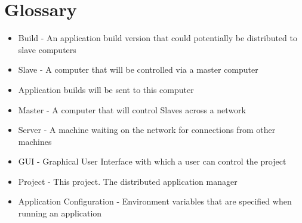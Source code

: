 \documentclass[a4paper,12pt,final]{article}
\begin{document}


\section{Glossary}
\begin{itemize}
\item Build - An application build version that could potentially be distributed to slave computers
\item Slave - A computer that will be controlled via a master computer
\item Application builds will be sent to this computer
\item Master - A computer that will control Slaves across a network
\item Server - A machine waiting on the network for connections from other machines
\item GUI - Graphical User Interface with which a user can control the project
\item Project - This project. The distributed application manager
\item Application Configuration - Environment variables that are specified when running an application
\end{itemize}
\end{document}

